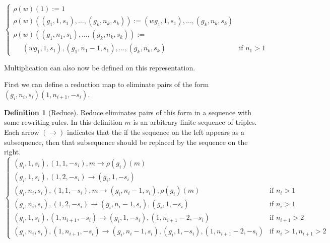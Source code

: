 \documentclass[12pt]{article} %
\theoremstyle{definition}
\theoremstyle{definition}
\theoremstyle{definition}
\theoremstyle{definition}
\theoremstyle{definition}
\newtheorem{defn}[theorem]{Definition}
\theoremstyle{definition}
\begin{document}
\begin{equation}
  \begin{cases}
    \rho(w)(1) := 1 \\
    \rho(w)((g_1, 1, s_1), \dots ,(g_k, n_k, s_k)) := (wg_1, 1, s_1), \dots, (g_k, n_k, s_k)\\
    \rho(w)((g_1, n_1, s_1),\dots ,(g_k, n_k, s_k)) := \\
     \ \ \ \ \ \ (wg_1, 1, s_1),(g_1, n_1 - 1, s_1),\dots,(g_k, n_k, s_k) & \text{if }n_1 > 1
  \end{cases}
\end{equation}

Multiplication can also now be defined on this representation.

First we can define a reduction map to eliminate pairs of the form
 $(g_i, n_i, s_i)(1, n_{i+1}, -s_i)$.
\begin{defn}[Reduce]
  Reduce eliminates pairs of this form in a sequence with some rewriting rules.
  In this definition $m$ is an arbitrary finite sequence of triples. Each arrow $(\to)$ indicates
  that the if the sequence on the left appears as a subsequence, then
  that subsequence should be replaced by the sequence on the right.
  \begin{equation}
    \begin{cases}
    (g_i, 1, s_i), (1, 1, -s_i), m \to \rho(g_i)(m) \\
    (g_i, 1, s_i), (1, 2, -s_i) \to
      (g_i, 1, -s_i) &  \\
    (g_i, n_i, s_i), (1, 1, -s_i), m \to (g_i, n_i - 1, s_i),
      \rho(g_i)(m) & \text{if } n_i > 1\\
    (g_i, n_i, s_i), (1, 2, -s_i) \to (g_i, n_i - 1, s_i), (g_i, 1, -s_i) & \text{if } n_i > 1\\
    (g_i, 1, s_i), (1, n_{i+1}, -s_i) \to
      (g_i, 1, -s_i), (1, n_{i+1} - 2, -s_i) &\text{if } n_{i+1} > 2 \\
    (g_i, n_i, s_i), (1, n_{i+1}, -s_i) \to
    (g_i, n_i - 1, s_i), (g_i, 1, -s_i), (1, n_{i + 1} - 2, -s_i) &
      \text{if } n_i > 1, n_{i+1} > 2
    \end{cases}
  \end{equation}

\end{defn}
\end{document}
